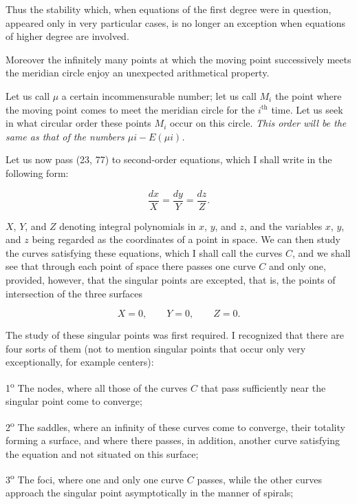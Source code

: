\documentclass[11pt]{article}
\begin{document}
Thus the stability which, when equations of the first degree were in question, appeared only in very particular cases, is no longer an exception when equations of higher degree are involved.

Moreover the infinitely many points at which the moving point successively meets the meridian circle enjoy an unexpected arithmetical property.

Let us call $\mu$ a certain incommensurable number; let us call $M_i$ the point where the moving point comes to meet the meridian circle for the $i^{\text{th}}$ time. Let us seek in what circular order these points $M_i$ occur on this circle. \emph{This order will be the same as that of the numbers $\mu i-E(\mu i)$.}

Let us now pass (23, 77) to second-order equations, which I shall write in the following form:

\begin{equation*}
\frac{dx}{X}=\frac{dy}{Y}=\frac{dz}{Z}.
\tag{4}
\end{equation*}

$X$, $Y$, and $Z$ denoting integral polynomials in $x$, $y$, and $z$, and the variables $x$, $y$, and $z$ being regarded as the coordinates of a point in space. We can then study the curves satisfying these equations, which I shall call the curves $C$, and we shall see that through each point of space there passes one curve $C$ and only one, provided, however, that the singular points are excepted, that is, the points of intersection of the three surfaces

\begin{equation*}
X=0,\qquad Y=0,\qquad Z=0.
\tag{5}
\end{equation*}

The study of these singular points was first required. I recognized that there are four sorts of them (not to mention singular points that occur only very exceptionally, for example centers):

1\textsuperscript{o} The nodes, where all those of the curves $C$ that pass sufficiently near the singular point come to converge;

2\textsuperscript{o} The saddles, where an infinity of these curves come to converge, their totality forming a surface, and where there passes, in addition, another curve satisfying the equation and not situated on this surface;

3\textsuperscript{o} The foci, where one and only one curve $C$ passes, while the other curves approach the singular point asymptotically in the manner of spirals;
\end{document}
